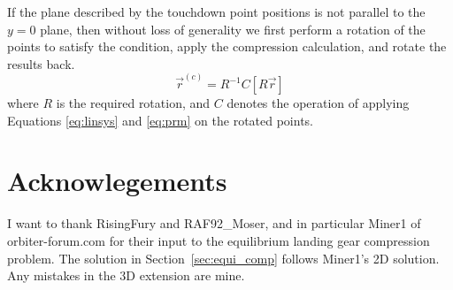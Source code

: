 \documentclass{article}
\begin{document}
If the plane described by the touchdown point positions is not parallel to the $y=0$ plane, then without loss of generality we first perform a rotation of the points to satisfy the condition, apply the compression calculation, and rotate the results back.
\begin{equation}
\vec{r}^{(c)} = R^{-1} C [R \vec{r}]
\end{equation}
where $R$ is the required rotation, and $C$ denotes the operation of applying Equations \ref{eq:linsys} and \ref{eq:prm} on the rotated points.

\section{Acknowlegements}
I want to thank RisingFury and RAF92\_Moser, and in particular Miner1 of orbiter-forum.com for their input to the equilibrium landing gear compression problem. The solution in Section~\ref{sec:equi_comp} follows Miner1's 2D solution. Any mistakes in the 3D extension are mine.


\end{document}
